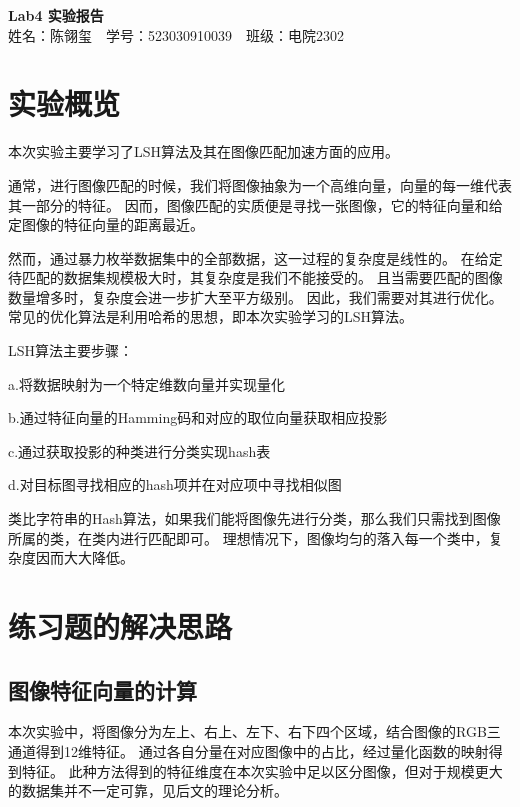 \documentclass{article}
\begin{document}
\begin{center}
    \Large \textbf{Lab4 实验报告}\\
    \vspace{1em}
    姓名：陈翎玺~~学号：523030910039~~班级：电院2302
\end{center}

\section{实验概览}

    本次实验主要学习了LSH算法及其在图像匹配加速方面的应用。

    通常，进行图像匹配的时候，我们将图像抽象为一个高维向量，向量的每一维代表其一部分的特征。
    因而，图像匹配的实质便是寻找一张图像，它的特征向量和给定图像的特征向量的距离最近。

    然而，通过暴力枚举数据集中的全部数据，这一过程的复杂度是线性的。
    在给定待匹配的数据集规模极大时，其复杂度是我们不能接受的。
    且当需要匹配的图像数量增多时，复杂度会进一步扩大至平方级别。
    因此，我们需要对其进行优化。常见的优化算法是利用哈希的思想，即本次实验学习的LSH算法。

    LSH算法主要步骤：

    a.将数据映射为一个特定维数向量并实现量化

    b.通过特征向量的Hamming码和对应的取位向量获取相应投影

    c.通过获取投影的种类进行分类实现hash表

    d.对目标图寻找相应的hash项并在对应项中寻找相似图

    类比字符串的Hash算法，如果我们能将图像先进行分类，那么我们只需找到图像所属的类，在类内进行匹配即可。
    理想情况下，图像均匀的落入每一个类中，复杂度因而大大降低。

\section{练习题的解决思路}

\subsection{图像特征向量的计算}

    本次实验中，将图像分为左上、右上、左下、右下四个区域，结合图像的RGB三通道得到12维特征。
    通过各自分量在对应图像中的占比，经过量化函数的映射得到特征。
    此种方法得到的特征维度在本次实验中足以区分图像，但对于规模更大的数据集并不一定可靠，见后文的理论分析。
\end{document}
